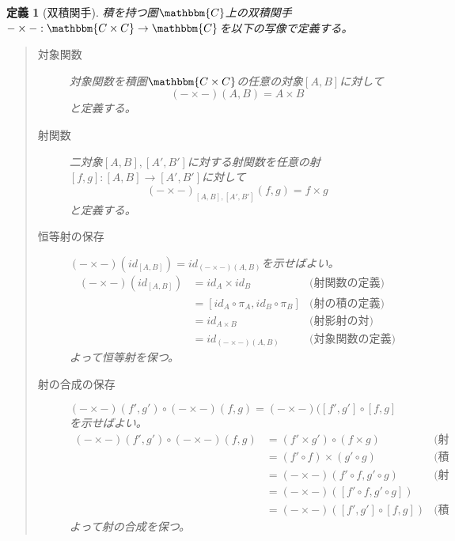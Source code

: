 \documentclass[dvipdfmx]{jsarticle}
\newcommand{\cat}[1]{\mathbbm{#1}}
\newcommand{\arrow}{\rightarrow}
\newcommand{\functor}[3]{#1:\cat{#2}\arrow \cat{#3}}
\newcommand{\mor}[3]{#1:#2\arrow #3}
\newcommand{\pcobj}[1]{[#1]}
\newtheorem{define}{定義}[section]
\numberwithin{proof}{subsection}
\numberwithin{prop}{subsection}
\numberwithin{define}{subsection}
\begin{document}
	\begin{define}[双積関手]
		積を持つ圏$\cat{C}$上の双積関手$\functor{-\times -}{C\times C}{C}$を以下の写像で定義する。
		\begin{quote}
			\begin{description}
				\item[対象関数] 対象関数を積圏$\cat{C\times C}$の任意の対象$\pcobj{A,B}$に対して\[(-\times -)(A,B)=A\times B\]と定義する。
				\item[射関数] 二対象$\pcobj{A,B},\pcobj{A',B'}$に対する射関数を任意の射$\mor{\pcobj{f,g}}{\pcobj{A,B}}{\pcobj{A',B'}}$に対して\[(-\times -)_{\pcobj{A,B},\pcobj{A',B'}}(f,g)=f\times g\]と定義する。
				\begin{center}
				\end{center}

				\item[恒等射の保存] $(-\times -)(id_{\pcobj{A,B}})=id_{(-\times-)(A,B)}$を示せばよい。
				\begin{align*}
					(-\times -)(id_{\pcobj{A,B}})&=id_A\times id_B&\text{(射関数の定義)}\\
					&=\pcobj{id_A\circ\pi_A,id_B\circ\pi_B}&\text{(射の積の定義)}\\
					&=id_{A\times B}&\text{(射影射の対)}\\
					&=id_{(-\times-)(A,B)}&\text{(対象関数の定義)}
				\end{align*}
				よって恒等射を保つ。
				\item[射の合成の保存] $(-\times -)(f',g')\circ(-\times-)(f,g)=(-\times-)(\pcobj{f',g'}\circ\pcobj{f,g}$を示せばよい。
				\begin{align*}
					(-\times -)(f',g')\circ(-\times-)(f,g)&=(f'\times g')\circ(f\times g)&\text{(射関数の定義)}\\
					&=(f'\circ f)\times(g'\circ g)&\text{(積と合成の交換)}\\
					&=(-\times-)(f'\circ f,g'\circ g)&\text{(射関数の定義)}\\
					&=(-\times-)(\pcobj{f'\circ f,g'\circ g})\\
					&=(-\times-)(\pcobj{f',g'}\circ\pcobj{f,g})&\text{(積圏の射の合成の定義)}
				\end{align*}
				よって射の合成を保つ。
			\end{description}
		\end{quote}
	\end{define}
\end{document}
